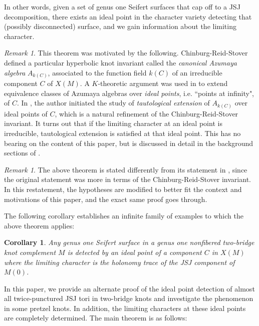 \documentclass{article}
\theoremstyle{plain}
\theoremstyle{definition}
\theoremstyle{plain}
\theoremstyle{plain}
\newtheorem{corollary}[theorem]{Corollary}
\theoremstyle{plain}
\theoremstyle{remark}
\newtheorem{remark}[theorem]{Remark}
\theoremstyle{remark}
\theoremstyle{plain}
\theoremstyle{plain}
\begin{document}
In other words, given a set of genus one Seifert surfaces that cap off to a JSJ decomposition, there exists an ideal point in the character variety detecting that (possibly disconnected) surface, and we gain information about the limiting character. 

\begin{remark}
This theorem was motivated by the following. Chinburg-Reid-Stover \cite{Chinburg2017AzumayaAA} defined a particular hyperbolic knot invariant called the \emph{canonical Azumaya algebra} $A_{k(C)}$, associated to the function field $k(C)$ of an irreducible component $C$ of $X(M)$. A $K$-theoretic argument was used in \cite{Chinburg2017AzumayaAA} to extend equivalence classes of Azumaya algebras over \emph{ideal points}, i.e. ``points at infinity", of $C$. In \cite{Wang}, the author initiated the study of \emph{tautological extension} of $A_{k(C)}$ over ideal points of $C$, which is a natural refinement of the Chinburg-Reid-Stover invariant. It turns out that if the limiting character at an ideal point is irreducible, tautological extension is satisfied at that ideal point. This has no bearing on the content of this paper, but is discussed in detail in the background sections of \cite{Wang}. 
\end{remark}

\begin{remark}
The above theorem is stated differently from its statement in \cite{Wang}, since the original statement was more in terms of the Chinburg-Reid-Stover invariant. In this restatement, the hypotheses are modified to better fit the context and motivations of this paper, and the exact same proof goes through. 
\end{remark}

The following corollary establishes an infinite family of examples to which the above theorem applies:

\begin{corollary}\label{cor:twobridgeseifert}
Any genus one Seifert surface in a genus one nonfibered two-bridge knot complement $M$ is detected by an ideal point of a component $C$ in $X(M)$ where the limiting character is the holonomy trace of the JSJ component of $M(0)$. 
\end{corollary}

In this paper, we provide an alternate proof of the ideal point detection of almost all twice-punctured JSJ tori in two-bridge knots and investigate the phenomenon in some pretzel knots. In addition, the limiting characters at these ideal points are completely determined. The main theorem is as follows: 
\end{document}
